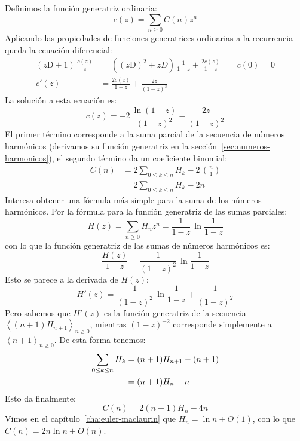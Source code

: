   Definimos la función generatriz ordinaria:
  \begin{equation*}
    c(z)
      = \sum_{n \ge 0} C(n) z^n
  \end{equation*}
  Aplicando las propiedades de funciones generatrices ordinarias
  a la recurrencia
  queda la ecuación diferencial:
  \begin{align*}
    \left( z \mathrm{D} + 1 \right) \, \frac{c(z)}{z}
      &= \left( (z \mathrm{D})^2 + z D \right) \, \frac{1}{1 - z}
	   + \frac{2 c(z)}{1 - z}
	   \qquad c(0) = 0 \\
    c'(z)
      &= \frac{2 c(z)}{1 - z} + \frac{2 z}{(1 - z)^3}
  \end{align*}
  La solución a esta ecuación es:
  \begin{equation*}
    c(z)
      = - 2 \, \frac{\ln (1 - z)}{(1 - z)^2}
	   - \frac{2 z}{(1 - z)^2}
  \end{equation*}
  El primer término corresponde
  a la suma parcial de la secuencia de números harmónicos
  (derivamos su función generatriz
   en la sección~\ref{sec:numeros-harmonicos}),
  el segundo término da un coeficiente binomial:
  \begin{align*}
    C(n)
      &= 2 \sum_{0 \le k \le n} H_k - 2 \, \binom{n}{1} \\
      &= 2 \sum_{0 \le k \le n} H_k - 2 n
  \end{align*}
  Interesa obtener una fórmula más simple
  para la suma de los números harmónicos.
  Por la fórmula para la función generatriz de las sumas parciales:
  \begin{equation*}
    H(z)
      = \sum_{n \ge 0} H_n z^n
      = \frac{1}{1 - z} \, \ln \frac{1}{1 - z}
  \end{equation*}
  con lo que la función generatriz de las sumas de números harmónicos es:
  \begin{equation}
    \label{eq:Hn-sum-gf}
    \frac{H(z)}{1 - z}
      = \frac{1}{(1 - z)^2} \, \ln \frac{1}{1 - z}
  \end{equation}
  Esto se parece a la derivada de \(H(z)\):
  \begin{equation*}
    H'(z)
      = \frac{1}{(1 - z)^2} \, \ln \frac{1}{1 - z} + \frac{1}{(1 - z)^2}
  \end{equation*}
  Pero sabemos que \(H'(z)\) es la función generatriz
  de la secuencia \(\left\langle (n + 1) H_{n + 1} \right\rangle_{n \ge 0}\),
  mientras \((1 - z)^{-2}\) corresponde simplemente
  a \(\left\langle n + 1 \right\rangle_{n \ge 0}\).
  De esta forma tenemos:
  \begin{align}
    \sum_{0 \le k \le n} H_k
      &= (n + 1) H_{n + 1} - (n + 1)
	   \notag \\
      &= (n + 1) H_n - n
	   \label{eq:Hn-sum}
  \end{align}
  Esto da finalmente:
  \begin{equation*}
    C(n)
      = 2 (n + 1) H_n - 4 n
  \end{equation*}
  Vimos en el capítulo~\ref{cha:euler-maclaurin}%
  que \(H_n = \ln n + O(1)\),
  con lo que \(C(n) = 2 n \ln n + O(n)\).

